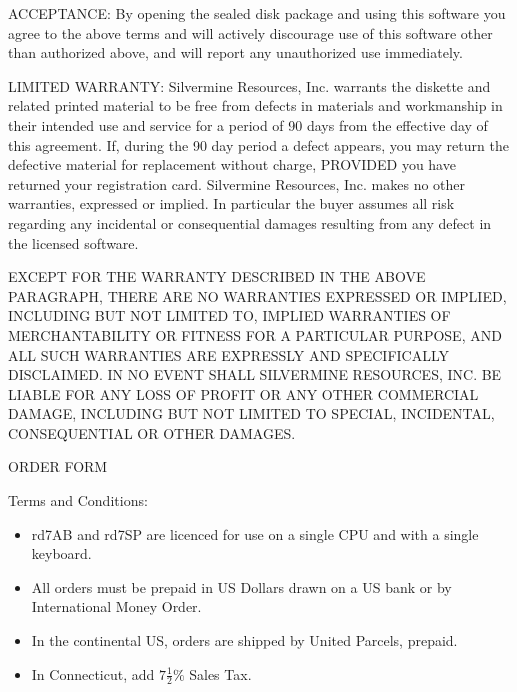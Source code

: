 ACCEPTANCE:  By opening the sealed disk package and using this
software you agree to the above terms and will actively discourage use
of this software other than authorized above, and will report any
unauthorized use immediately.

LIMITED WARRANTY:  Silvermine Resources, Inc. warrants the diskette
and related printed material to be free from defects in materials and
workmanship in their intended use and service for a period of 90 days
from the effective day of this agreement.  If, during the 90 day period
a defect appears, you may return the defective material for
replacement without charge, PROVIDED you have returned your
registration card.  Silvermine Resources, Inc. makes no other
warranties, expressed or implied.  In particular the buyer assumes
all risk regarding any incidental or consequential damages resulting
from any defect in the licensed software.  

EXCEPT FOR THE WARRANTY DESCRIBED IN THE ABOVE PARAGRAPH, THERE ARE
NO WARRANTIES EXPRESSED OR IMPLIED, INCLUDING BUT NOT LIMITED TO,
IMPLIED WARRANTIES OF MERCHANTABILITY OR FITNESS FOR A PAR\-TIC\-U\-LAR
PURPOSE, AND ALL SUCH WARRANTIES ARE EXPRESSLY AND SPECIFICALLY
DISCLAIMED.  IN NO EVENT SHALL SILVERMINE RESOURCES, INC. BE LIABLE
FOR ANY LOSS OF PROFIT OR ANY OTHER COMMERCIAL DAMAGE, INCLUDING BUT
NOT LIMITED TO SPECIAL, INCIDENTAL, CONSEQUENTIAL OR OTHER DAMAGES.
 
 
\newpage

\begin{center}
                               ORDER FORM
\end{center}

Terms and Conditions:
\begin{itemize}
\item 
  rd7AB and rd7SP are licenced for use on a single CPU and 
	with a single keyboard.

\item
 All orders must be prepaid in US Dollars drawn on a US bank
	or by International Money Order.

\item
 In the continental US, orders are shipped by United Parcels,
	prepaid. 

\item 
 In Connecticut, add $7\frac{1}{2}\%$ Sales Tax.
\end{itemize}


